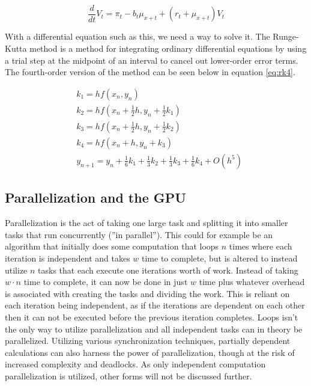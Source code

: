 \begin{equation}\label{eq:thiele}
\frac{d}{dt}V_t = \pi_t - b_t \mu_{x+t} + (r_t + \mu_{x+t}) V_t
\end{equation}

With a differential equation such as this, we need a way to solve it. 
The Runge-Kutta method\cite{runge-kutta} is a method for integrating ordinary differential equations by using a trial step at the midpoint of an interval to cancel out lower-order error terms.
The fourth-order version of the method can be seen below in equation \ref{eq:rk4}.

\begin{equation}\begin{aligned}\label{eq:rk4}
&k_1 = h f(x_n, y_n)\\
&k_2 = h f(x_n + \frac{1}{2}h, y_n + \frac{1}{2}k_1)\\
&k_3 = h f(x_n + \frac{1}{2}h, y_n + \frac{1}{2}k_2)\\
&k_4 = h f(x_n + h, y_n + k_3)\\
&y_{n+1} = y_n + \frac{1}{6}k_1 + \frac{1}{3}k_2 + \frac{1}{3}k_3 + \frac{1}{6}k_4 + O(h^5)
\end{aligned}\end{equation}

\subsection{Parallelization and the GPU}
Parallelization is the act of taking one large task and splitting it into smaller tasks that run concurrently (''in parallel'').
This could for example be an algorithm that initially does some computation that loops $n$ times where each iteration is independent and takes $w$ time to complete, but is altered to instead utilize $n$ tasks that each execute one iterations worth of work.
Instead of taking $w \cdot n$ time to complete, it can now be done in just $w$ time plus whatever overhead is associated with creating the tasks and dividing the work.
This is reliant on each iteration being independent, as if the iterations are dependent on each other then it can not be executed before the previous iteration completes.
Loops isn't the only way to utilize parallelization and all independent tasks can in theory be parallelized. 
Utilizing various synchronization techniques, partially dependent calculations can also harness the power of parallelization, though at the risk of increased complexity and deadlocks.
As only independent computation parallelization is utilized, other forms will not be discussed further.

